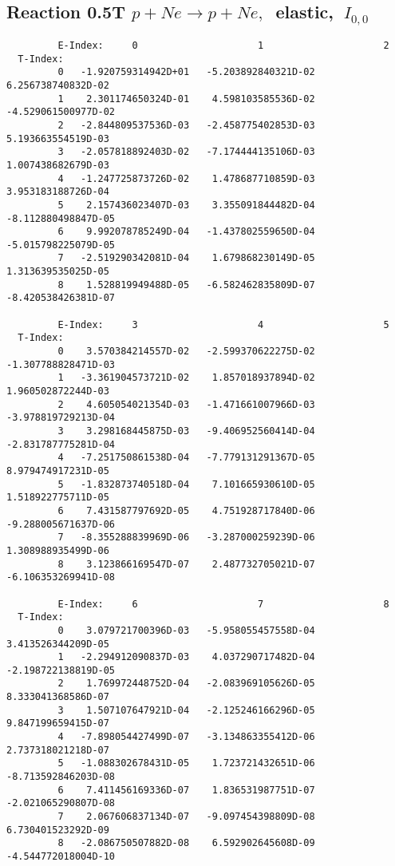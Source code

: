 \documentclass[12pt]{article}
\begin{document}
\subsection{
Reaction 0.5T  $p + Ne \rightarrow p + Ne ,\ $
 elastic, $\  I_{0,0}$
}

\begin{small}\begin{verbatim}
         E-Index:     0                     1                     2
  T-Index:
         0   -1.920759314942D+01   -5.203892840321D-02    6.256738740832D-02
         1    2.301174650324D-01    4.598103585536D-02   -4.529061500977D-02
         2   -2.844809537536D-03   -2.458775402853D-03    5.193663554519D-03
         3   -2.057818892403D-02   -7.174444135106D-03    1.007438682679D-03
         4   -1.247725873726D-02    1.478687710859D-03    3.953183188726D-04
         5    2.157436023407D-03    3.355091844482D-04   -8.112880498847D-05
         6    9.992078785249D-04   -1.437802559650D-04   -5.015798225079D-05
         7   -2.519290342081D-04    1.679868230149D-05    1.313639535025D-05
         8    1.528819949488D-05   -6.582462835809D-07   -8.420538426381D-07
 
         E-Index:     3                     4                     5
  T-Index:
         0    3.570384214557D-02   -2.599370622275D-02   -1.307788828471D-03
         1   -3.361904573721D-02    1.857018937894D-02    1.960502872244D-03
         2    4.605054021354D-03   -1.471661007966D-03   -3.978819729213D-04
         3    3.298168445875D-03   -9.406952560414D-04   -2.831787775281D-04
         4   -7.251750861538D-04   -7.779131291367D-05    8.979474917231D-05
         5   -1.832873740518D-04    7.101665930610D-05    1.518922775711D-05
         6    7.431587797692D-05    4.751928717840D-06   -9.288005671637D-06
         7   -8.355288839969D-06   -3.287000259239D-06    1.308988935499D-06
         8    3.123866169547D-07    2.487732705021D-07   -6.106353269941D-08
 
         E-Index:     6                     7                     8
  T-Index:
         0    3.079721700396D-03   -5.958055457558D-04    3.413526344209D-05
         1   -2.294912090837D-03    4.037290717482D-04   -2.198722138819D-05
         2    1.769972448752D-04   -2.083969105626D-05    8.333041368586D-07
         3    1.507107647921D-04   -2.125246166296D-05    9.847199659415D-07
         4   -7.898054427499D-07   -3.134863355412D-06    2.737318021218D-07
         5   -1.088302678431D-05    1.723721432651D-06   -8.713592846203D-08
         6    7.411456169336D-07    1.836531987751D-07   -2.021065290807D-08
         7    2.067606837134D-07   -9.097454398809D-08    6.730401523292D-09
         8   -2.086750507882D-08    6.592902645608D-09   -4.544772018004D-10
\end{verbatim}\end{small}
 
\end{document}
